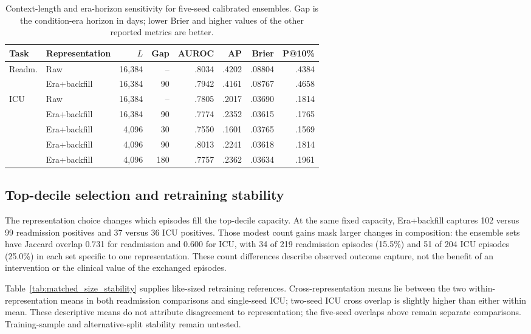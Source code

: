 \documentclass{article}
\begin{document}
\begin{table}[!htbp]
  \caption{Context-length and era-horizon sensitivity for five-seed calibrated
  ensembles. Gap is the condition-era horizon in days; lower Brier and higher
  values of the other reported metrics are better.}
  \label{tab:sensitivity_results}
  \centering
  \footnotesize
  \begin{tabular*}{\linewidth}{@{\extracolsep{\fill}}llrrrrrr@{}}
    \toprule
    Task & Representation & $L$ & Gap & AUROC & AP & Brier & P@10\% \\
    \midrule
    \multirow{2}{*}{Readm.}
      & Raw & 16,384 & -- & .8034 & .4202 & .08804 & .4384 \\
      & Era+backfill & 16,384 & 90 & .7942 & .4161 & .08767 & .4658 \\
    \midrule
    \multirow{5}{*}{ICU}
      & Raw & 16,384 & -- & .7805 & .2017 & .03690 & .1814 \\
      & Era+backfill & 16,384 & 90 & .7774 & .2352 & .03615 & .1765 \\
      & Era+backfill & 4,096 & 30 & .7550 & .1601 & .03765 & .1569 \\
      & Era+backfill & 4,096 & 90 & .8013 & .2241 & .03618 & .1814 \\
      & Era+backfill & 4,096 & 180 & .7757 & .2362 & .03634 & .1961 \\
    \bottomrule
  \end{tabular*}
\end{table}

\FloatBarrier

\subsection{Top-decile selection and retraining stability}

The representation choice changes which episodes fill the top-decile capacity.
At the same fixed capacity, Era+backfill captures 102 versus 99
readmission positives and 37 versus 36 ICU positives. Those modest count gains
mask larger changes in composition: the ensemble sets have Jaccard overlap
0.731 for readmission and 0.600 for ICU, with 34 of 219 readmission episodes
(15.5\%) and 51 of 204 ICU episodes (25.0\%) in each set specific to one
representation. These count differences describe observed outcome capture, not
the benefit of an intervention or the clinical value of the exchanged episodes.

Table~\ref{tab:matched_size_stability} supplies like-sized retraining references.
Cross-representation means lie between the two within-representation means in
both readmission comparisons and single-seed ICU; two-seed ICU cross overlap
is slightly higher than either within mean. These descriptive means do not
attribute disagreement to representation; the five-seed overlaps above remain
separate comparisons. Training-sample and alternative-split stability remain
untested.
\end{document}
